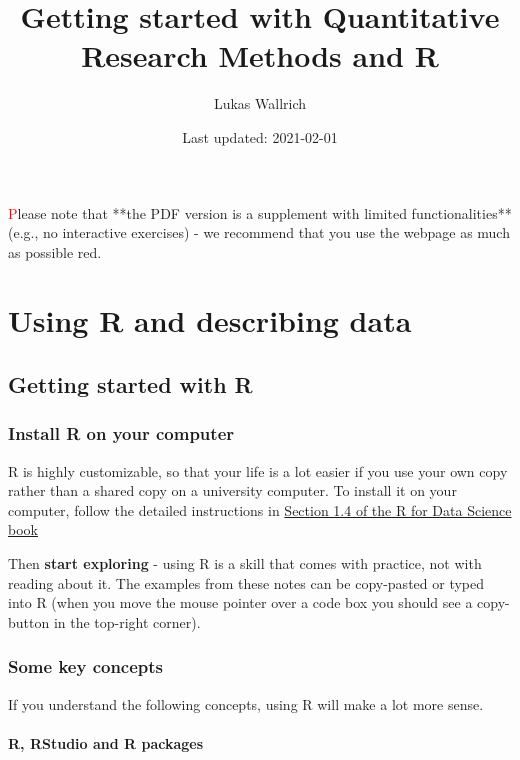 \documentclass[
]{book}
\title{Getting started with Quantitative Research Methods and R}
\author{Lukas Wallrich}
\date{Last updated: 2021-02-01}
\begin{document}
\maketitle

{
\setcounter{tocdepth}{1}
\tableofcontents
}
\textcolor{red}Please note that **the PDF version is a supplement with limited functionalities** (e.g., no interactive exercises) - we recommend that you use the webpage as much as possible {red}.

\hypertarget{part-using-r-and-describing-data}{%
\part*{Using R and describing data}\label{part-using-r-and-describing-data}}

\hypertarget{getting-started-with-r}{%
\chapter{Getting started with R}\label{getting-started-with-r}}

\hypertarget{install-r-on-your-computer}{%
\section{Install R on your computer}\label{install-r-on-your-computer}}

R is highly customizable, so that your life is a lot easier if you use your own copy rather than a shared copy on a university computer. To install it on your computer, follow the detailed instructions in \href{https://r4ds.had.co.nz/introduction.html}{Section 1.4 of the R for Data Science book}

Then \textbf{start exploring} - using R is a skill that comes with practice, not with reading about it. The examples from these notes can be copy-pasted or typed into R (when you move the mouse pointer over a code box you should see a copy-button in the top-right corner).

\hypertarget{some-key-concepts}{%
\section{Some key concepts}\label{some-key-concepts}}

If you understand the following concepts, using R will make a lot more sense.

\hypertarget{r-rstudio-and-r-packages}{%
\subsection{R, RStudio and R packages}\label{r-rstudio-and-r-packages}}
\end{document}
